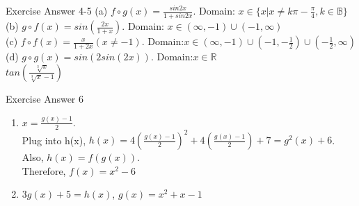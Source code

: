 \begin{frame}{Exercise Answer 4-5}
    (a) $f\circ g(x)=\frac{sin 2x}{1+sin 2x}$. Domain: $x\in\{x|x\neq k\pi-\frac{\pi}{4},k\in\mathbb{B}\}$\\
    (b) $g\circ f(x)=sin(\frac{2x}{1+x})$. Domain: $x\in (\infty,-1)\cup(-1,\infty)$\\
    (c) $f\circ f(x)=\frac{x}{1+2x}(x\neq-1)$. Domain:$x\in (\infty,-1)\cup(-1,-\frac{1}{2})\cup (-\frac{1}{2},\infty)$\\
    (d) $g\circ g(x)=sin(2sin(2x))$. Domain:$x\in\mathbb{R}$\\
    \vspace{1.5cm}
    $tan(\frac{\sqrt[3]{x}}{\sqrt[3]{x}-1})$
\end{frame}

\begin{frame}{Exercise Answer 6}
    \begin{enumerate}
        \item $x=\frac{g(x)-1}{2}$.\\
              Plug into h(x), $h(x)=4(\frac{g(x)-1}{2})^2+4(\frac{g(x)-1}{2})+7=g^2(x)+6$.\\
              Also, $h(x)=f(g(x))$.\\
              Therefore, $f(x)=x^2-6$
        \item $3g(x)+5=h(x)$, $g(x)=x^2+x-1$
    \end{enumerate}
\end{frame}